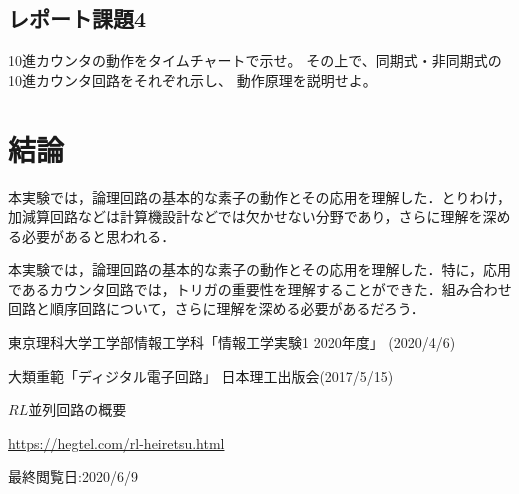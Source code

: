 \documentclass[12pt]{jarticle}
\begin{document}
\begin{itemize}
\end{itemize}

\subsection{レポート課題4}
\begin{shadebox}
    10進カウンタの動作をタイムチャートで示せ。
    その上で、同期式・非同期式の10進カウンタ回路をそれぞれ示し、
    動作原理を説明せよ。
\end{shadebox}

\section{結論}

本実験では，論理回路の基本的な素子の動作とその応用を理解した．とりわけ，加減算回路などは計算機設計などでは欠かせない分野であり，さらに理解を深める必要があると思われる．

本実験では，論理回路の基本的な素子の動作とその応用を理解した．特に，応用であるカウンタ回路では，トリガの重要性を理解することができた．組み合わせ回路と順序回路について，さらに理解を深める必要があるだろう．


\begin{thebibliography}{99}
    \label{sannkoubunnkenn_chapter}
    東京理科大学工学部情報工学科「情報工学実験1 2020年度」
    (2020/4/6)

    大類重範「ディジタル電子回路」
    日本理工出版会(2017/5/15)

    $RL$並列回路の概要

    \url{https://hegtel.com/rl-heiretsu.html}

    最終閲覧日:2020/6/9

\end{thebibliography}

\clearpage
\appendix
\end{document}
